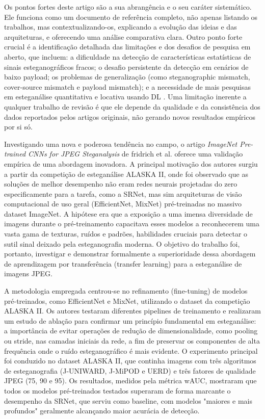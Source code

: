 \documentclass[12pt]{article}
\begin{document}
Os pontos fortes deste artigo são a sua abrangência e o seu caráter
sistemático. Ele funciona como um documento de referência completo, não apenas
listando os trabalhos, mas contextualizando-os, explicando a evolução das
ideias e das arquiteturas, e oferecendo uma análise comparativa clara. Outro
ponto forte crucial é a identificação detalhada das limitações e dos desafios
de pesquisa em aberto, que incluem: a dificuldade na detecção de
características estatísticas de sinais esteganográficos fracos; o desafio
persistente da detecção em cenários de baixo payload; os problemas de
generalização (como steganographic mismatch, cover-source mismatch e payload
mismatch); e a necessidade de mais pesquisas em esteganálise quantitativa e
locativa usando DL \cite{farooq2023systematic}. Uma limitação inerente a
qualquer trabalho de revisão é que ele depende da qualidade e da consistência
dos dados reportados pelos artigos originais, não gerando novos resultados
empíricos por si só.

Investigando uma nova e poderosa tendência no campo, o artigo \textit{ImageNet
  Pre-trained CNNs for JPEG Steganalysis} de fridrich et al.
\cite{fridrich2020imagenet} oferece uma validação empírica de uma abordagem
inovadora. A principal motivação dos autores surgiu a partir da competição de
esteganálise ALASKA II, onde foi observado que as soluções de melhor desempenho
não eram redes neurais projetadas do zero especificamente para a tarefa, como a
SRNet, mas sim arquiteturas de visão computacional de uso geral (EfficientNet,
MixNet) pré-treinadas no massivo dataset ImageNet. A hipótese era que a
exposição a uma imensa diversidade de imagens durante o pré-treinamento
capacitava esses modelos a reconhecerem uma vasta gama de texturas, ruídos e
padrões, habilidades cruciais para detectar o sutil sinal deixado pela
esteganografia moderna. O objetivo do trabalho foi, portanto, investigar e
demonstrar formalmente a superioridade dessa abordagem de aprendizagem por
transferência (transfer learning) para a esteganálise de imagens JPEG.

A metodologia empregada centrou-se no refinamento (fine-tuning) de modelos
pré-treinados, como EfficientNet e MixNet, utilizando o dataset da competição
ALASKA II. Os autores testaram diferentes pipelines de treinamento e realizaram
um estudo de ablação para confirmar um princípio fundamental em esteganálise: a
importância de evitar operações de redução de dimensionalidade, como pooling ou
stride, nas camadas iniciais da rede, a fim de preservar os componentes de alta
frequência onde o ruído esteganográfico é mais evidente. O experimento
principal foi conduzido no dataset ALASKA II, que continha imagens com três
algoritmos de esteganografia (J-UNIWARD, J-MiPOD e UERD) e três fatores de
qualidade JPEG (75, 90 e 95). Os resultados, medidos pela métrica wAUC,
mostraram que todos os modelos pré-treinados testados superaram de forma
marcante o desempenho da SRNet, que serviu como baseline, com modelos "maiores
e mais profundos" geralmente alcançando maior acurácia de detecção.
\end{document}
